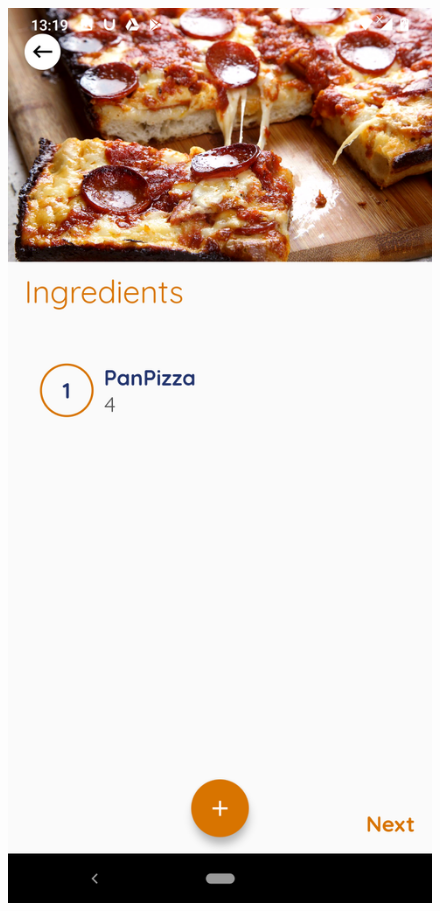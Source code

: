 \documentclass{article}
\begin{document}
\begin{figure}[h!]
        \includegraphics[scale=0.1]{Images/Panpizza_ingre.jpg}

\end{figure}
\end{document}
